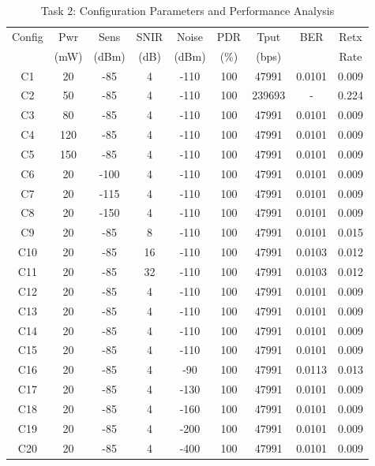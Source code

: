 \documentclass{article}
\begin{document}
\begin{table}[H]
\centering
\caption{Task 2: Configuration Parameters and Performance Analysis}
\small
\begin{tabular}{|c|c|c|c|c|c|c|c|c|}
\hline
Config & Pwr & Sens & SNIR & Noise & PDR & Tput & BER & Retx \\
 & (mW) & (dBm) & (dB) & (dBm) & (\%) & (bps) &  & Rate \\
\hline
C1 & 20 & -85 & 4 & -110 & 100 & 47991 & 0.0101 & 0.009 \\
C2 & 50 & -85 & 4 & -110 & 100 & 239693 & - & 0.224 \\
C3 & 80 & -85 & 4 & -110 & 100 & 47991 & 0.0101 & 0.009 \\
C4 & 120 & -85 & 4 & -110 & 100 & 47991 & 0.0101 & 0.009 \\
C5 & 150 & -85 & 4 & -110 & 100 & 47991 & 0.0101 & 0.009 \\
C6 & 20 & -100 & 4 & -110 & 100 & 47991 & 0.0101 & 0.009 \\
C7 & 20 & -115 & 4 & -110 & 100 & 47991 & 0.0101 & 0.009 \\
C8 & 20 & -150 & 4 & -110 & 100 & 47991 & 0.0101 & 0.009 \\
C9 & 20 & -85 & 8 & -110 & 100 & 47991 & 0.0101 & 0.015 \\
C10 & 20 & -85 & 16 & -110 & 100 & 47991 & 0.0103 & 0.012 \\
C11 & 20 & -85 & 32 & -110 & 100 & 47991 & 0.0103 & 0.012 \\
C12 & 20 & -85 & 4 & -110 & 100 & 47991 & 0.0101 & 0.009 \\
C13 & 20 & -85 & 4 & -110 & 100 & 47991 & 0.0101 & 0.009 \\
C14 & 20 & -85 & 4 & -110 & 100 & 47991 & 0.0101 & 0.009 \\
C15 & 20 & -85 & 4 & -110 & 100 & 47991 & 0.0101 & 0.009 \\
C16 & 20 & -85 & 4 & -90 & 100 & 47991 & 0.0113 & 0.013 \\
C17 & 20 & -85 & 4 & -130 & 100 & 47991 & 0.0101 & 0.009 \\
C18 & 20 & -85 & 4 & -160 & 100 & 47991 & 0.0101 & 0.009 \\
C19 & 20 & -85 & 4 & -200 & 100 & 47991 & 0.0101 & 0.009 \\
C20 & 20 & -85 & 4 & -400 & 100 & 47991 & 0.0101 & 0.009 \\
\hline
\end{tabular}
\end{table}
\end{document}
